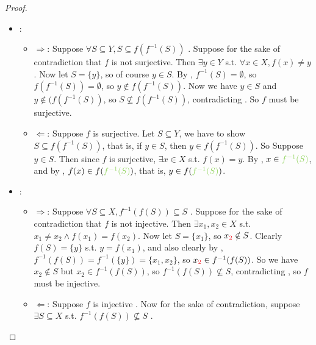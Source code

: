 \begin{proof}
\begin{itemize}
    \item {}:
        \begin{itemize}
            \item \(\Longrightarrow\):
                Suppose \(\forall S \subseteq Y, S \subseteq f(f^{-1}(S))\) .
                Suppose for the sake of contradiction that \(f\) is not surjective.
                Then \(\exists y \in Y\) s.t. \(\forall x \in X, f(x) \neq y\).
                Now let \(S = \{ y \}\), so of course \(y \in S\).
                By , \(f^{-1}(S) = \emptyset\), so \(f(f^{-1}(S)) = \emptyset\), so \(y \notin f(f^{-1}(S))\).
                Now we have \(y \in S\) and \(y \notin (f(f^{-1}(S))\), so \(S \not\subseteq f(f^{-1}(S))\), contradicting .
                So \(f\) must be surjective.
            \item \(\Longleftarrow\):
                Suppose \(f\) is surjective. Let \(S \subseteq Y\), we have to show \(S \subseteq f(f^{-1}(S))\),
                that is, if \(y \in S\), then \(y \in f(f^{-1}(S))\).
                So Suppose \(y \in S\). Then since \(f\) is surjective, \(\exists x \in X\) s.t. \(f(x) = y\).
                By , \(x \in \GREEN{f^{-1}(S)}\),
                and by , \(f(x) \in f(\GREEN{f^{-1}(S)})\), that is, \(y \in f(\GREEN{f^{-1}(S)})\).
        \end{itemize}
    \item {}:
        \begin{itemize}
            \item \(\Longrightarrow\):
                Suppose \(\forall S \subseteq X, f^{-1}(f(S)) \subseteq S\) .
                Suppose for the sake of contradiction that \(f\) is not injective.
                Then \(\exists x_1, x_2 \in X\) s.t. \(x_1 \neq x_2 \land f(x_1) = f(x_2)\).
                Now let \(S = \{ x_1 \} \), so \(x_{\RED{2}} \notin S\).
                Clearly \(f(S) = \{ y \}\) s.t. \(y = f(x_1)\),
                and also clearly by , \(f^{-1}(f(S)) = f^{-1}( \{ y \} ) = \{ x_1, x_2 \}\),
                so \(x_{\RED{2}} \in f^{-1}(f(S))\).
                So we have \(x_2 \notin S\) but \(x_2 \in f^{-1}(f(S))\),
                so \(f^{-1}(f(S)) \not\subseteq S\), contradicting ,
                so \(f\) must be injective.
            \item \(\Longleftarrow\):
                Suppose \(f\) is injective .
                Now for the sake of contradiction, suppose \(\exists S \subseteq X\) s.t. \(f^{-1}(f(S)) \not\subseteq S\) .

\end{itemize}
\end{itemize}
\end{proof}
